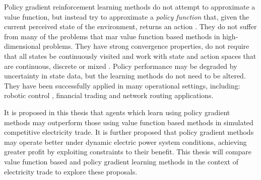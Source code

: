 Policy gradient reinforcement learning methods do not attempt to approximate a
value function, but instead try to approximate a \textit{policy function} that,
given the current perceived state of the environment, returns an action
\cite{petersScholar}. They do not suffer from many of the problems that mar
value function based methods in high-dimensional problems.  They have strong
convergence properties, do not require that all states be continuously visited
and work with state and action spaces that are continuous, discrete or mixed
\cite{peters:enac}.  Policy performance may be degraded by uncertainty in state
data, but the learning methods do not need to be altered.
They have been successfully applied in many operational settings, including:
robotic control \cite{shaal:robots}, financial trading \cite{moody:direct} and
network routing \cite{peshkin:routing} applications.

It is proposed in this thesis that agents which learn using policy gradient
methods may outperform those using value function based methods in simulated
competitive electricity trade.  It is further proposed that policy gradient
methods may operate better under dynamic electric power system conditions,
achieving greater profit by exploiting constraints to their benefit.
This thesis will compare value function based and policy gradient learning
methods in the context of electricity trade to explore these proposals.



